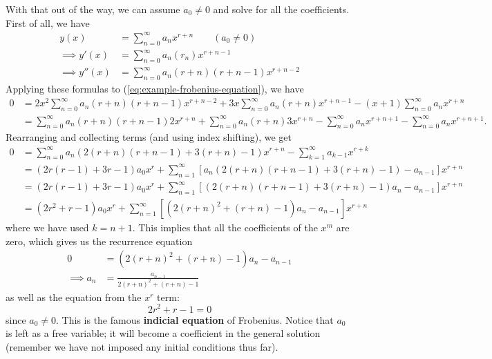 \documentclass[11pt, letterpaper, oneside]{article}     %
\numberwithin{equation}{subsection}
\theoremstyle{definition}
\numberwithin{theorem}{section}
\theoremstyle{remark}
\begin{document}
\begin{enumerate}
  With that out of the way, we can assume $a_0 \neq 0$ and solve for all the coefficients. First of all, we have
  \begin{align}
    y(x) &= \sum_{n=0}^\infty a_nx^{r+n}\quad\quad(a_0 \neq 0)\\
    \implies y'(x) &= \sum_{n=0}^\infty a_n(r_n)x^{r+n-1}\\
    \implies y''(x) &= \sum_{n=0}^\infty a_n(r+n)(r+n-1)x^{r+n-2}
  \end{align}
  Applying these formulas to (\ref{eq:example-frobenius-equation}), we have
  \begin{align}
    0 &= 2x^2\sum_{n=0}^\infty a_n(r+n)(r+n-1)x^{r+n-2} + 3x\sum_{n=0}^\infty a_n(r+n)x^{r+n-1}
    - (x+1)\sum_{n=0}^\infty a_nx^{r+n}\\
    &= \sum_{n=0}^\infty a_n(r+n)(r+n-1)2x^{r+n} + \sum_{n=0}^\infty a_n(r+n)3x^{r+n}
    - \sum_{n=0}^\infty a_nx^{r+n+1} - \sum_{n=0}^\infty a_nx^{r+n+1}.
  \end{align}
  Rearranging and collecting terms (and using index shifting), we get
  \begin{align}
    0 &= \sum_{n=0}^\infty a_n\left(2(r+n)(r+n-1) + 3(r+n) - 1\right)x^{r+n}
    - \sum_{k=1}^\infty a_{k-1}x^{r+k}\\
    &= (2r(r-1) + 3r - 1)a_0x^r + \sum_{n=1}^\infty \left[a_n\left(2(r+n)(r+n-1) + 3(r+n) - 1\right) - a_{n-1}\right]x^{r+n}\\
    &= (2r(r-1) + 3r - 1)a_0x^r + \sum_{n=1}^\infty \left[\left(2(r+n)(r+n-1) + 3(r+n) - 1\right)a_n - a_{n-1}\right]x^{r+n}\\
    &= (2r^2 + r - 1)a_0x^r + \sum_{n=1}^\infty \left[\left(2(r+n)^2 + (r+n) - 1\right)a_n - a_{n-1}\right]x^{r+n}
  \end{align}
  where we have used $k = n+1$. This implies that all the coefficients of the $x^m$ are zero, which gives us the recurrence equation
  \begin{align}
    0 &= \left(2(r+n)^2 + (r+n) - 1\right)a_n - a_{n-1}\\
    \implies a_n &= \frac{a_{n-1}}{2(r+n)^2 + (r+n) - 1}
  \end{align}
  as well as the equation from the $x^r$ term:
  \begin{equation}\label{eq:r-equation-frob}
    2r^2 + r - 1 = 0
  \end{equation}
  since $a_0 \neq 0$. This is the famous \textbf{indicial equation} of Frobenius. Notice that $a_0$ is left as a free variable; it will become a coefficient in the general solution (remember we have not imposed any initial conditions thus far).


\end{enumerate}
\end{document}
